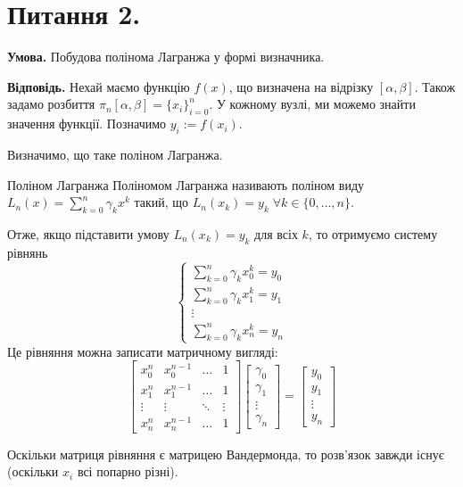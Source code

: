 \documentclass[14pt]{extarticle}
\begin{document}
\pagebreak

\section*{Питання 2.}

\textbf{Умова.} Побудова полінома Лагранжа у формі визначника.

\textbf{Відповідь.} Нехай маємо функцію $f(x)$, що визначена на відрізку $[\alpha,\beta]$. Також задамо розбиття $\pi_n[\alpha,\beta]=\{x_i\}_{i=0}^{n}$. У кожному вузлі, ми можемо знайти значення функції. Позначимо $y_i:=f(x_i)$. 

Визначимо, що таке поліном Лагранжа.

\begin{def*}{Поліном Лагранжа}
    Поліномом Лагранжа називають поліном виду $L_n(x)=\sum_{k=0}^n \gamma_kx^k$ такий, що $L_n(x_k)=y_k \; \forall k \in \{0,\dots,n\}$. 
\end{def*}

Отже, якщо підставити умову $L_n(x_k)=y_k$ для всіх $k$, то отримуємо систему рівнянь
\[
\begin{cases}
    \sum_{k=0}^n \gamma_kx_0^k = y_0 \\
    \sum_{k=0}^n \gamma_kx_1^k = y_1 \\
    \vdots \\
    \sum_{k=0}^n \gamma_kx_n^k = y_n
\end{cases}
\]
Це рівняння можна записати матричному вигляді:
\[
\begin{bmatrix}
    x_0^n & x_0^{n-1} & \dots & 1 \\
    x_1^{n} & x_1^{n-1} & \dots & 1 \\
    \vdots & \vdots & \ddots & \vdots \\ 
    x_n^n & x_n^{n-1} & \dots & 1
\end{bmatrix}\begin{bmatrix}
    \gamma_0 \\ \gamma_1 \\ \vdots \\ \gamma_n
\end{bmatrix} = \begin{bmatrix}
    y_0 \\ y_1 \\ \vdots \\ y_n
\end{bmatrix}
\]

Оскільки матриця рівняння є матрицею Вандермонда, то розв'язок завжди існує (оскільки $x_i$ всі попарно різні). 
\end{document}

